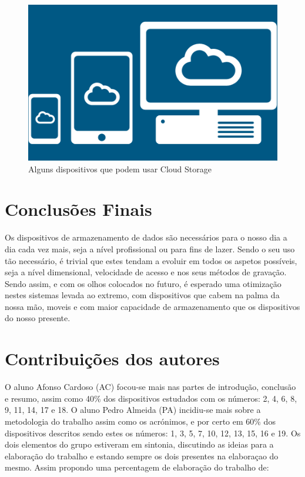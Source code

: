 \documentclass{report}
\begin{document}
\vspace{15mm}
 
 	\begin{figure} [h]
		\centering
		\includegraphics[scale=0.5]{cloud-storage2.png}
		\caption{Alguns dispositivos que podem usar Cloud Storage}
	\end{figure}
	

\chapter{Conclusões Finais}
\label{chap.conclusao}

	Os dispositivos de armazenamento de dados são necessários para o nosso dia a dia cada vez mais, seja a nível profissional ou para fins de lazer. Sendo o seu uso tão necessário, é trivial que estes tendam a evoluir em todos os aspetos possíveis, seja a nível dimensional, velocidade de acesso e nos seus métodos de gravação. Sendo assim, e com os olhos colocados no futuro, é esperado uma otimização nestes sistemas levada ao extremo, com dispositivos que cabem na palma da nossa mão, moveis e com maior capacidade de armazenamento que os dispositivos do nosso presente.

 
\chapter*{Contribuições dos autores}

	O aluno Afonso Cardoso (AC) focou-se mais nas partes de introdução, conclusão e resumo, assim como 40\% dos dispositivos estudados com os números: 2, 4, 6, 8, 9, 11, 14, 17 e 18. 
	O aluno Pedro Almeida (PA) incidiu-se mais sobre a metodologia do trabalho assim como os acrónimos, e por certo em 60\% dos dispositivos descritos sendo estes os números: 1, 3, 5, 7, 10, 12, 13, 15, 16 e 19.
	Os dois elementos do grupo estiveram em sintonia, discutindo as ideias para a elaboração do trabalho e estando sempre os dois presentes na elaboraçao do mesmo. Assim propondo uma percentagem de elaboração do trabalho de:
\end{document}
